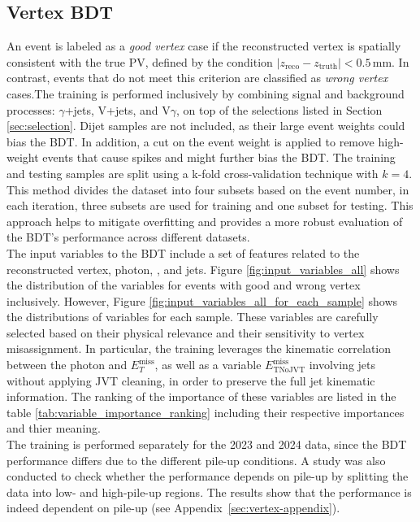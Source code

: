 \subsection{Vertex BDT}
An event is labeled as a \textit{good vertex} case if the reconstructed vertex is spatially consistent with the true PV, defined by the condition \( |z_{\text{reco}} - z_{\text{truth}}| < 0.5\,\text{mm} \). In contrast, events that do not meet this criterion are classified as \textit{wrong vertex} cases.The training is performed inclusively by combining signal and background processes: $\gamma$+jets, V+jets, and V$\gamma$, on top of the selections listed in Section \ref{sec:selection}. Dijet samples are not included, as their large event weights could bias the BDT. In addition, a cut on the event weight is applied to remove high-weight events that cause spikes and might further bias the BDT. The training and testing samples are split using a k-fold cross-validation technique with \( k=4 \). This method divides the dataset into four subsets based on the event number, in each iteration, three subsets are used for training and one subset for testing. This approach helps to mitigate overfitting and provides a more robust evaluation of the BDT's performance across different datasets.\\
The input variables to the BDT include a set of features related to the reconstructed vertex, photon, \ETmiss, and jets. Figure \ref{fig:input_variables_all} shows the distribution of the variables for events with good and wrong vertex inclusively. However, Figure \ref{fig:input_variables_all_for_each_sample} shows the distributions of variables for each sample. These variables are carefully selected based on their physical relevance and their sensitivity to vertex misassignment. In particular, the training leverages the kinematic correlation between the photon and \( E_T^{\text{miss}} \), as well as a variable \( E_{\text{T{NoJVT}}}^{\text{miss }} \) involving jets without applying  JVT cleaning, in order to preserve the full jet kinematic information. The ranking of the importance of these variables are listed in the table \ref{tab:variable_importance_ranking} including their respective importances and thier meaning.\\
The training is performed separately for the 2023 and 2024 data, since the BDT performance differs due to the different pile-up conditions. A study was also conducted to check whether the performance depends on pile-up by splitting the data into low- and high-pile-up regions. The results show that the performance is indeed dependent on pile-up (see Appendix~\ref{sec:vertex-appendix}).\\
